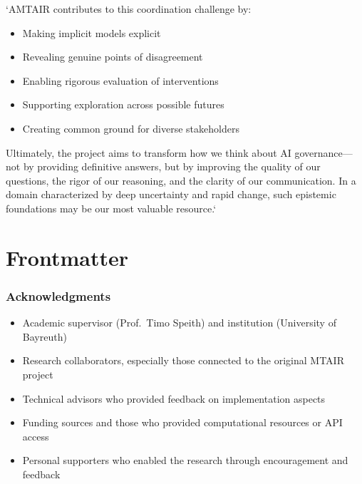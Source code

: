 \documentclass[]{book}
\providecommand{\tightlist}{%
  \setlength{\itemsep}{0pt}\setlength{\parskip}{0pt}}
\begin{document}
`AMTAIR contributes to this coordination challenge by:

\begin{itemize}
\tightlist
\item
  Making implicit models explicit
\item
  Revealing genuine points of disagreement
\item
  Enabling rigorous evaluation of interventions
\item
  Supporting exploration across possible futures
\item
  Creating common ground for diverse stakeholders
\end{itemize}

Ultimately, the project aims to transform how we think about AI
governance---not by providing definitive answers, but by improving the
quality of our questions, the rigor of our reasoning, and the clarity of
our communication. In a domain characterized by deep uncertainty and
rapid change, such epistemic foundations may be our most valuable
resource.`


\chapter*{Frontmatter}\label{frontmatter}


\subsection*{\texorpdfstring{\textbf{Acknowledgments}}{Acknowledgments}}\label{acknowledgments}

\begin{itemize}
\tightlist
\item
  Academic supervisor (Prof.~Timo Speith) and institution (University of
  Bayreuth)\\
\item
  Research collaborators, especially those connected to the original
  MTAIR project\\
\item
  Technical advisors who provided feedback on implementation aspects\\
\item
  Funding sources and those who provided computational resources or API
  access\\
\item
  Personal supporters who enabled the research through encouragement and
  feedback
\end{itemize}
\end{document}

